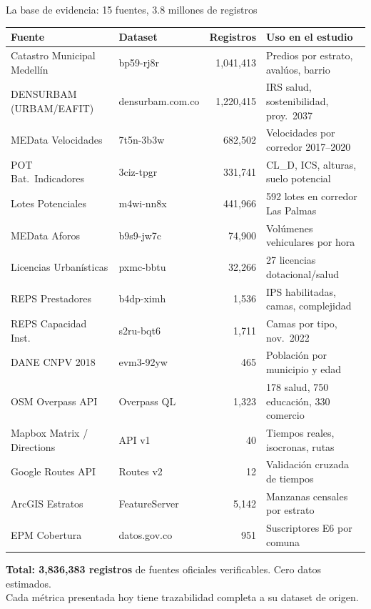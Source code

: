 \documentclass[aspectratio=169, 11pt]{beamer}
\begin{document}
\begin{frame}{La base de evidencia: 15 fuentes, 3.8 millones de registros}

\vspace{2pt}
{\scriptsize
\begin{tabular}{@{}p{4.2cm}lrp{5.2cm}@{}}
\toprule
\textbf{Fuente} & \textbf{Dataset} & \textbf{Registros} & \textbf{Uso en el estudio} \\
\midrule
Catastro Municipal Medellín & bp59-rj8r & 1,041,413 & Predios por estrato, avalúos, barrio \\
DENSURBAM (URBAM/EAFIT) & densurbam.com.co & 1,220,415 & IRS salud, sostenibilidad, proy.\ 2037 \\
MEData Velocidades & 7t5n-3b3w & 682,502 & Velocidades por corredor 2017--2020 \\
POT Bat.\ Indicadores & 3ciz-tpgr & 331,741 & CL\_D, ICS, alturas, suelo potencial \\
Lotes Potenciales & m4wi-nn8x & 441,966 & 592 lotes en corredor Las Palmas \\
MEData Aforos & b9s9-jw7c & 74,900 & Volúmenes vehiculares por hora \\
Licencias Urbanísticas & pxmc-bbtu & 32,266 & 27 licencias dotacional/salud \\
REPS Prestadores & b4dp-ximh & 1,536 & IPS habilitadas, camas, complejidad \\
REPS Capacidad Inst.\ & s2ru-bqt6 & 1,711 & Camas por tipo, nov.\ 2022 \\
DANE CNPV 2018 & evm3-92yw & 465 & Población por municipio y edad \\
OSM Overpass API & Overpass QL & 1,323 & 178 salud, 750 educación, 330 comercio \\
Mapbox Matrix / Directions & API v1 & 40 & Tiempos reales, isocronas, rutas \\
Google Routes API & Routes v2 & 12 & Validación cruzada de tiempos \\
ArcGIS Estratos & FeatureServer & 5,142 & Manzanas censales por estrato \\
EPM Cobertura & datos.gov.co & 951 & Suscriptores E6 por comuna \\
\bottomrule
\end{tabular}
}

\vspace{8pt}
\begin{center}
{\small\textbf{Total: 3,836,383 registros} de fuentes oficiales verificables. Cero datos estimados.\\[2pt]
Cada métrica presentada hoy tiene trazabilidad completa a su dataset de origen.}
\end{center}
\end{frame}
\end{document}
